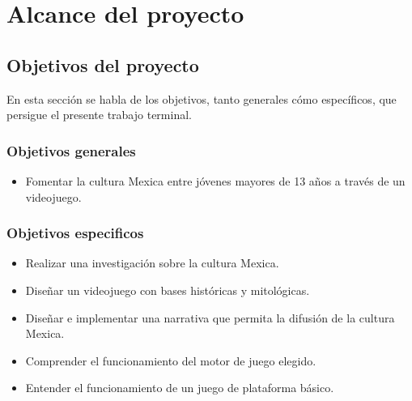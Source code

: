 \chapter{Alcance del proyecto}
	\section{Objetivos del proyecto} \label{Sec_ObjetivosPro}
	En esta sección se habla de los objetivos, tanto generales cómo específicos, 
	que persigue el presente trabajo terminal.
		\subsection{Objetivos generales}\label{Sec_ObjetivosGen}		
			\begin{itemize}
				\item Fomentar la cultura Mexica entre jóvenes mayores de 13 años a
				 través de un videojuego.
			\end{itemize}
			
		\subsection{Objetivos especificos} \label{Sec_ObjetivosEsp}
			\begin{itemize}
				\item Realizar una investigación sobre la cultura Mexica.
				\item Diseñar un videojuego con bases históricas y mitológicas.
				\item Diseñar e implementar una narrativa que permita la difusión de 
				la cultura Mexica. 
				\item Comprender el funcionamiento del motor de juego elegido.
				\item Entender el funcionamiento de un juego de plataforma básico.
			\end{itemize}
			
